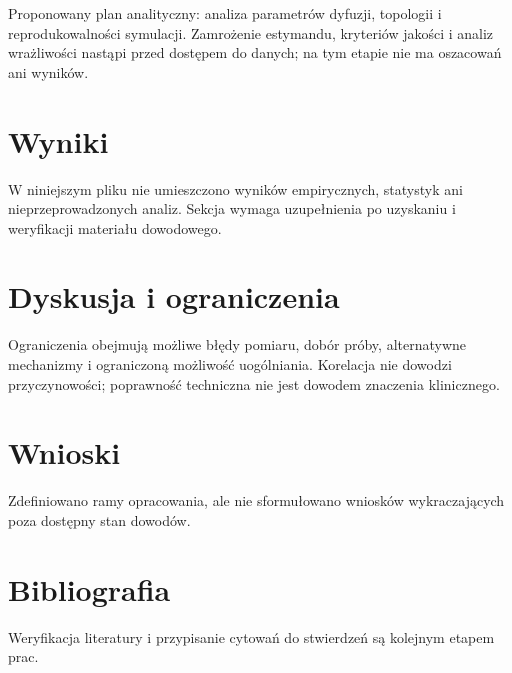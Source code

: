 \documentclass[11pt,a4paper]{article}
\begin{document}
Proponowany plan analityczny: analiza parametrów dyfuzji, topologii i reprodukowalności symulacji. Zamrożenie estymandu, kryteriów jakości i analiz wrażliwości nastąpi przed dostępem do danych; na tym etapie nie ma oszacowań ani wyników.

\section{Wyniki}

W niniejszym pliku nie umieszczono wyników empirycznych, statystyk ani nieprzeprowadzonych analiz. Sekcja wymaga uzupełnienia po uzyskaniu i weryfikacji materiału dowodowego.

\section{Dyskusja i ograniczenia}

Ograniczenia obejmują możliwe błędy pomiaru, dobór próby, alternatywne mechanizmy i ograniczoną możliwość uogólniania. Korelacja nie dowodzi przyczynowości; poprawność techniczna nie jest dowodem znaczenia klinicznego.

\section{Wnioski}

Zdefiniowano ramy opracowania, ale nie sformułowano wniosków wykraczających poza dostępny stan dowodów.

\section*{Bibliografia}

Weryfikacja literatury i przypisanie cytowań do stwierdzeń są kolejnym etapem prac.
\end{document}
